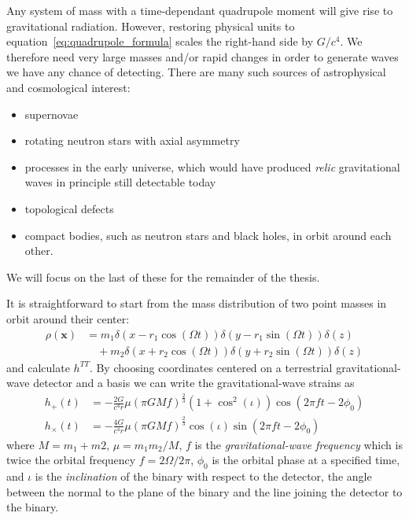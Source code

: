 Any system of mass with a time-dependant quadrupole moment will give
rise to gravitational radiation.  However, restoring physical units to
equation~\ref{eq:quadrupole_formula} scales the right-hand side by
$G/c^4$.  We therefore need very large masses and/or rapid changes in
order to generate waves we have any chance of detecting.  There are
many such sources of astrophysical and cosmological interest:
%
\begin{itemize}
\item supernovae
\item rotating neutron stars with axial asymmetry
\item processes in the early universe, which would have produced
\emph{relic} gravitational waves in principle still detectable today
\item topological defects
\item compact bodies, such as neutron stars and black holes, in 
orbit around each other.
\end{itemize}
%
We will focus on the last of these for the remainder of the thesis.

It is straightforward to start from the mass distribution of two point
masses in orbit around their center:
%
\begin{align*}
\rho(\mathbf{x}) &= m_1\delta(x - r_1\cos(\Omega t)) \delta(y-r_1
\sin(\Omega t)) \delta(z) \\
&\quad + m_2\delta(x + r_2\cos(\Omega t)) \delta(y + r_2 \sin(\Omega t))
\delta(z)
\end{align*}
%
and calculate $h^{TT}$. By choosing coordinates centered on a
terrestrial gravitational-wave detector and a basis we can write
the gravitational-wave strains as~\cite{DBrownThesis}
%
\begin{align}
\label{eq:h_plus_cross}
h_+(t)   &= - \frac{2G}{c^4 r} \mu (\pi G M f)^{\frac{2}{3}}
(1+\cos^2(\iota)) \cos(2\pi f t - 2\phi_0) \\ \nonumber
h_\times(t)  &= - \frac{4G}{c^4 r} \mu (\pi G M f)^{\frac{2}{3}}
\cos(\iota) \sin(2\pi f t - 2\phi_0) \nonumber
\end{align}
%
where $M = m_1+m2$, $\mu = m_1 m_2 / M$, $f$ is the
\emph{gravitational-wave frequency} which is twice the orbital
frequency $f = 2\Omega/2\pi$, $\phi_0$ is the orbital phase at a
specified time, and $\iota$ is the \emph{inclination} of the binary
with respect to the detector, the angle between the normal to the
plane of the binary and the line joining the detector to the binary.

